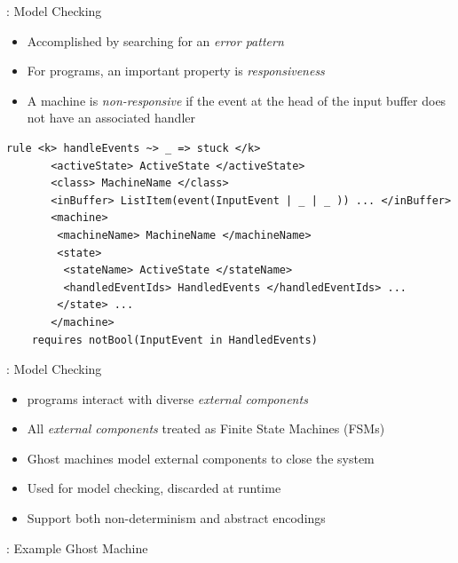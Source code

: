 \documentclass{beamer}
\begin{document}
\begin{frame}[fragile]{\MediK{}: Model Checking}
  \begin{itemize}
    \item Accomplished by searching for an \emph{error pattern}
    \item For \MediK{} programs, an important property is \emph{responsiveness}
    \item A machine is \emph{non-responsive} if the event at the head of the
      input buffer does not have an associated handler
  \end{itemize}
  \pause
  \begin{lstlisting}[language=k,style=ksty,basicstyle=\ttfamily\tiny]
  rule <k> handleEvents ~> _ => stuck </k>
       <activeState> ActiveState </activeState>
       <class> MachineName </class>
       <inBuffer> ListItem(event(InputEvent | _ | _ )) ... </inBuffer>
       <machine>
        <machineName> MachineName </machineName>
        <state>
         <stateName> ActiveState </stateName>
         <handledEventIds> HandledEvents </handledEventIds> ...
        </state> ...
       </machine>
    requires notBool(InputEvent in HandledEvents)
  \end{lstlisting}
\end{frame}
\begin{frame}{\MediK{}: Model Checking}
  \begin{itemize}
    \item \MediK{} programs interact with diverse \emph{external components}
    \item All \emph{external components} treated as Finite State Machines (FSMs)
    \item \alert{Ghost machines} model external components to close the system
    \item Used for model checking, discarded at runtime
    \item Support both \alert{non-determinism} and \alert{abstract encodings}
  \end{itemize}
\end{frame}
\begin{frame}[fragile]{\MediK{}: Example Ghost Machine}
  
\end{frame}
\end{document}
